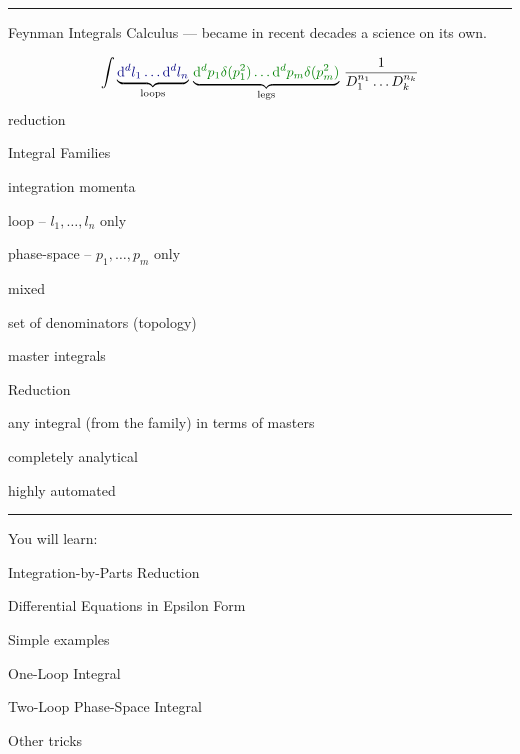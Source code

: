 \documentclass[11pt]{article}
\newcommand{\titleb}[2]{{\color{Blue}{\LARGE #1}\hfill{\Large #2}\vspace{-2mm}\par\rule{\textwidth}{1pt}\vs}}
\newcommand{\titlea}[1]{\titleb{#1}{}}
\begin{document}
\titlea{Introduction}

Feynman Integrals Calculus --- became in recent decades a science on its own. 

  \begin{equation*}
    \int {\color{Black}\underbrace{ \color{NavyBlue}\D^d l_1 \ldots \D^d l_n}_{\text{loops}}} \,\, 
         {\color{Black}\underbrace{\color{Green} \D^d p_1 \delta(p_1^2) \ldots \D^d p_m \delta(p_m^2)}_{\text{legs}}} \,\, \frac{1}{D_1^{n_1} \ldots D_k^{n_k}}
  \end{equation*}
  reduction
 \bi
   \item Integral Families
   \bi
     \item integration momenta
     \bi
       \item loop -- $l_1,\ldots,l_n$ only
       \item phase-space -- $p_1,\ldots,p_m$ only
       \item mixed 
     \ei
     \item set of denominators (topology)
     \item master integrals
   \ei
   \item Reduction
   \bi
     \item any integral (from the family) in terms of masters
     \bi
       \item {}
     \ei
     \item completely analytical
     \item highly automated
   \ei
 \ei
\newpage
 

\titlea{Plan for Today}

\vs
You will learn:
\bi
  \item Integration-by-Parts Reduction
  \bi
    \item \litered
  \ei
  \item Differential Equations in Epsilon Form
  \bi
    \item \fuchsia
  \ei
  \item Simple examples
  \bn
    \item One-Loop Integral
    \item Two-Loop Phase-Space Integral
  \en
  \item Other tricks
\ei
\newpage
\end{document}

